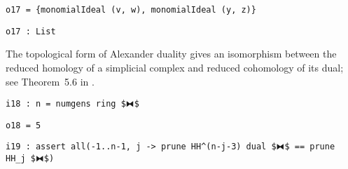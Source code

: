 \documentclass[12pt,leqno]{amsart}
\theoremstyle{definition}
\begin{document}
\begin{lstlisting}[xleftmargin=10pt, lineskip=-10pt, aboveskip=4pt, belowskip=1pt]
o17 = {monomialIdeal (v, w), monomialIdeal (y, z)}
\end{lstlisting}
\begin{lstlisting}[xleftmargin=10pt, aboveskip=1pt, belowskip=3pt]
o17 : List
\end{lstlisting}
The topological form of Alexander duality gives an isomorphism
between the reduced homology of a simplicial complex and reduced cohomology of
its dual; see Theorem~5.6 in \cite{MS}.
\begin{lstlisting}[xleftmargin=10pt, aboveskip=3pt, belowskip=1.5pt]
i18 : n = numgens ring $⧓$
\end{lstlisting}
\begin{lstlisting}[xleftmargin=10pt, lineskip=-10pt, aboveskip=4pt, belowskip=1pt]
o18 = 5
\end{lstlisting}
\begin{lstlisting}[xleftmargin=10pt, aboveskip=1pt, belowskip=3pt]
i19 : assert all(-1..n-1, j -> prune HH^(n-j-3) dual $⧓$ == prune HH_j $⧓$)
\end{lstlisting}
\end{document}
